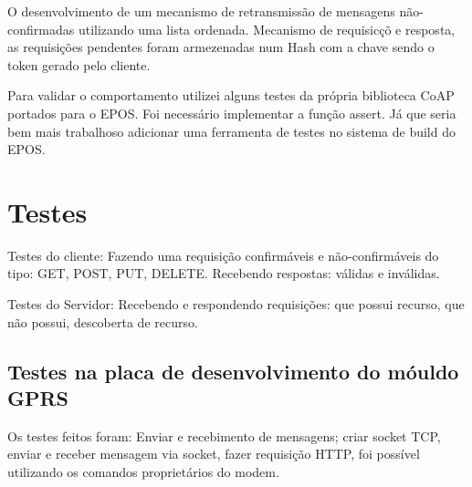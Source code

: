 O desenvolvimento de um mecanismo de retransmiss\~ao de mensagens n\~ao-confirmadas utilizando uma lista ordenada. Mecanismo de requisic\c{c}\~o e resposta, as requisi\c{c}\~oes pendentes foram armezenadas num Hash com a chave sendo o token gerado pelo cliente.

Para validar o comportamento utilizei alguns testes da pr\'opria biblioteca CoAP portados para o EPOS. Foi necess\'ario implementar a fun\c{c}\~ao assert. J\'a que seria bem mais trabalhoso adicionar uma ferramenta de testes no sistema de build do EPOS.

\section{Testes}
Testes do cliente:
Fazendo uma requisi\c{c}\~ao confirm\'aveis e n\~ao-confirm\'aveis do tipo: GET, POST, PUT, DELETE.
Recebendo respostas: válidas e inválidas.


Testes do Servidor:
Recebendo e respondendo requisi\c{c}\~oes: que possui recurso, que n\~ao possui, descoberta de recurso.

\subsection{Testes na placa de desenvolvimento do m\'ouldo GPRS}
Os testes feitos foram: Enviar e recebimento de mensagens; criar socket TCP, enviar e receber mensagem via socket, fazer requisi\c{c}\~ao HTTP, foi poss\'ivel utilizando os comandos propriet\'arios do modem.
